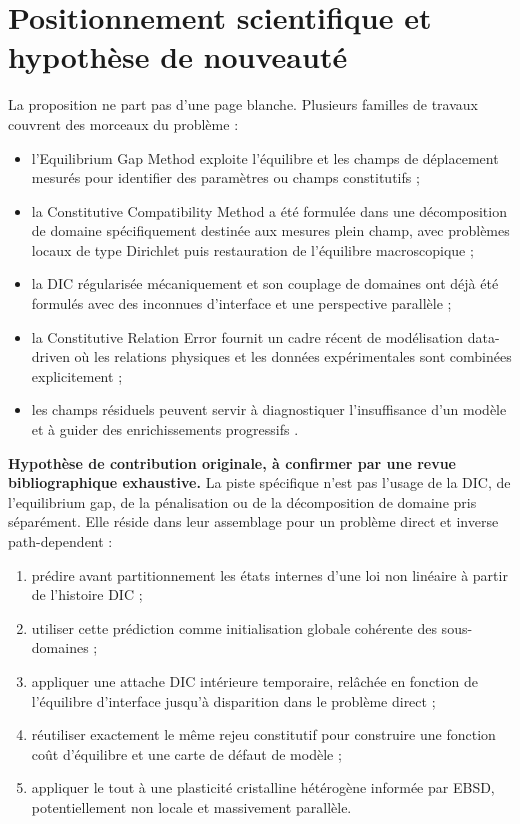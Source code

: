 \documentclass[11pt,a4paper]{article}
\begin{document}
\section{Positionnement scientifique et hypothèse de nouveauté}

La proposition ne part pas d'une page blanche. Plusieurs familles de travaux couvrent des morceaux
du problème :
\begin{itemize}
  \item l'Equilibrium Gap Method exploite l'équilibre et les champs de déplacement mesurés pour
  identifier des paramètres ou champs constitutifs \parencite{claire2004equilibrium};
  \item la Constitutive Compatibility Method a été formulée dans une décomposition de domaine
  spécifiquement destinée aux mesures plein champ, avec problèmes locaux de type Dirichlet puis
  restauration de l'équilibre macroscopique \parencite{lubineau2015dd};
  \item la DIC régularisée mécaniquement et son couplage de domaines ont déjà été formulés avec des
  inconnues d'interface et une perspective parallèle \parencite{bouclier2017domain,mendoza2019regularization};
  \item la Constitutive Relation Error fournit un cadre récent de modélisation data-driven où les
  relations physiques et les données expérimentales sont combinées explicitement
  \parencite{ladeveze2024cre};
  \item les champs résiduels peuvent servir à diagnostiquer l'insuffisance d'un modèle et à guider
  des enrichissements progressifs \parencite{neggers2017enrichment}.
\end{itemize}

\begin{ideabox}
\textbf{Hypothèse de contribution originale, à confirmer par une revue bibliographique exhaustive.}
La piste spécifique n'est pas l'usage de la DIC, de l'equilibrium gap, de la pénalisation ou de la
décomposition de domaine pris séparément. Elle réside dans leur assemblage pour un problème direct
et inverse path-dependent :
\begin{enumerate}
  \item prédire avant partitionnement les états internes d'une loi non linéaire à partir de l'histoire DIC ;
  \item utiliser cette prédiction comme initialisation globale cohérente des sous-domaines ;
  \item appliquer une attache DIC intérieure temporaire, relâchée en fonction de l'équilibre d'interface jusqu'à disparition dans le problème direct ;
  \item réutiliser exactement le même rejeu constitutif pour construire une fonction coût d'équilibre et une carte de défaut de modèle ;
  \item appliquer le tout à une plasticité cristalline hétérogène informée par EBSD, potentiellement non locale et massivement parallèle.
\end{enumerate}
\end{ideabox}
\end{document}
